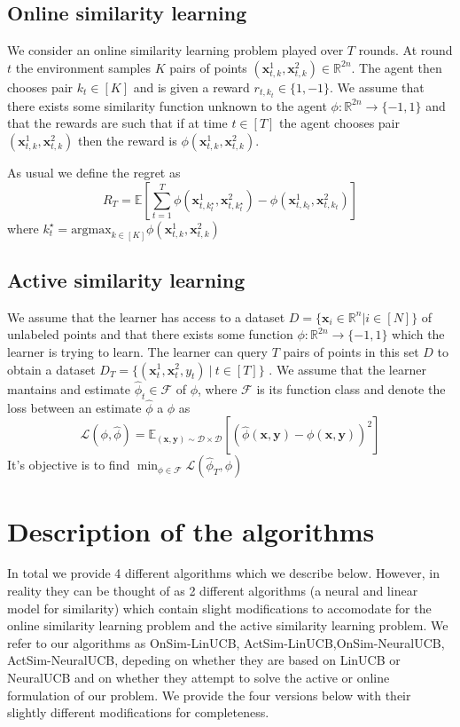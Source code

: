 \documentclass{article}
\begin{document}
\subsection{Online similarity learning}
\label{problem-statement:online-similarity-learning}
We consider an online similarity learning problem played over $T$ rounds.
At round $t$ the environment samples $K$ pairs of points $(\mathbf{x}_{t,k}^1, \mathbf{x}_{t,k}^2) \in \mathbb{R}^{2n}$.
The agent then chooses pair $k_t \in [K]$ and is given a reward $r_{t,k_{t}} \in \{1, -1\}$.
We assume that there exists some similarity function unknown to the agent $\phi: \mathbb{R}^{2n} \to \{-1, 1 \}$
and that the rewards are such that if at time $t \in [T]$ the agent chooses pair $(\mathbf{x}_{t,k}^1, \mathbf{x}_{t,k}^2)$
then the reward is $\phi(\mathbf{x}_{t,k}^1, \mathbf{x}_{t,k}^2)$.

As usual we define the regret as
\[ R_T = \mathbb{E}\left[\sum_{t =1}^T \phi(\mathbf{x}_{t,k^\star_t}^1, \mathbf{x}_{t,k^\star_t}^2) - \phi(\mathbf{x}_{t,k_t}^1, \mathbf{x}_{t,k_t}^2)\right]\]
where $k_t^\star = \text{argmax}_{k\in [K]} \phi(\mathbf{x}_{t,k}^1, \mathbf{x}_{t,k}^2)$

\subsection{Active similarity learning}
\label{problem-statement:active-similarity-learning}
We assume that the learner has access to a dataset $D = \{\mathbf{x}_i \in \mathbb{R}^n| i \in [N]\}$ of unlabeled points and that there exists some function $\phi: \mathbb{R}^{2n} \to \{-1, 1\}$ which the learner is trying to learn.
The learner can query $T$ pairs of points in this set $D$ to obtain a dataset $D_T = \{(\mathbf{x}_t^1, \mathbf{x}_t^2, y_t) ~|  ~t \in [T]\}$ . We assume that the learner mantains and estimate $\hat{\phi}_t \in \mathcal{F}$ of $\phi$, where $\mathcal{F}$ is its function class  and denote the loss between an estimate $\hat{\phi}$ a $\phi$ as
\[ \mathcal{L}(\phi, \hat{\phi}) = \mathbb{E}_\mathcal{(\mathbf{x}, \mathbf{y}) \sim \mathcal{D} \times \mathcal{D}}[(\hat{\phi}(\mathbf{x},\mathbf{y}) - \phi(\mathbf{x}, \mathbf{y}))^2] \]
It's objective is to find $\min_{\phi \in \mathcal{F}} \mathcal{L}(\hat{\phi}_T, \phi)$


\section{Description of the algorithms}
In total we provide 4 different algorithms which we describe below.
However, in reality they can be thought of as 2 different algorithms (a neural and linear model for similarity)  which contain slight modifications to accomodate for the online similarity learning problem and the active similarity learning problem.
We refer to our algorithms as OnSim-LinUCB, ActSim-LinUCB,OnSim-NeuralUCB, ActSim-NeuralUCB, depeding on whether they are based on LinUCB or NeuralUCB and on whether they attempt to solve the active or online formulation of our problem.
We provide the four versions below with their slightly different modifications for completeness.
\end{document}
